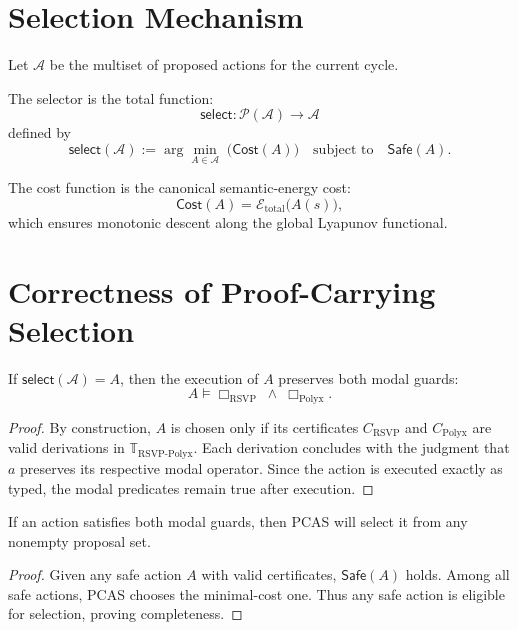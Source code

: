 \section{Selection Mechanism}

Let $\mathcal{A}$ be the multiset of proposed actions for the current cycle.

\begin{definition}
The selector is the total function:
\[
\mathsf{select} : \mathcal{P}(\mathcal{A}) \to \mathcal{A}
\]
defined by
\[
\mathsf{select}(\mathcal{A})
  := \arg\min_{A\in\mathcal{A}} \;
     \bigl(\mathsf{Cost}(A)\bigr)
\quad\text{subject to}\quad
\mathsf{Safe}(A).
\]
\end{definition}

The cost function is the canonical semantic-energy cost:
\[
\mathsf{Cost}(A)
   = \mathcal{E}_{\mathrm{total}}
       \bigl(A(s) \bigr),
\]
which ensures monotonic descent along the global Lyapunov functional.

\section{Correctness of Proof-Carrying Selection}

\begin{theorem}[Soundness]
\label{thm:soundness_pcas}
If $\mathsf{select}(\mathcal{A}) = A$, then the execution of $A$ preserves
both modal guards:
\[
A \models \Box_{\mathrm{RSVP}} \;\wedge\; \Box_{\mathrm{Polyx}}.
\]
\end{theorem}

\begin{proof}
By construction, $A$ is chosen only if its certificates $C_{\mathrm{RSVP}}$ and
$C_{\mathrm{Polyx}}$ are valid derivations in
$\mathbb{T}_{\mathrm{RSVP\text{-}Polyx}}$.  
Each derivation concludes with the judgment that $a$ preserves its respective
modal operator.  
Since the action is executed exactly as typed, the modal predicates remain
true after execution.
\end{proof}

\begin{theorem}[Completeness]
If an action satisfies both modal guards, then PCAS will select it
from any nonempty proposal set.
\end{theorem}

\begin{proof}
Given any safe action $A$ with valid certificates,
$\mathsf{Safe}(A)$ holds.  
Among all safe actions, PCAS chooses the minimal-cost one.  
Thus any safe action is eligible for selection, proving completeness.
\end{proof}


